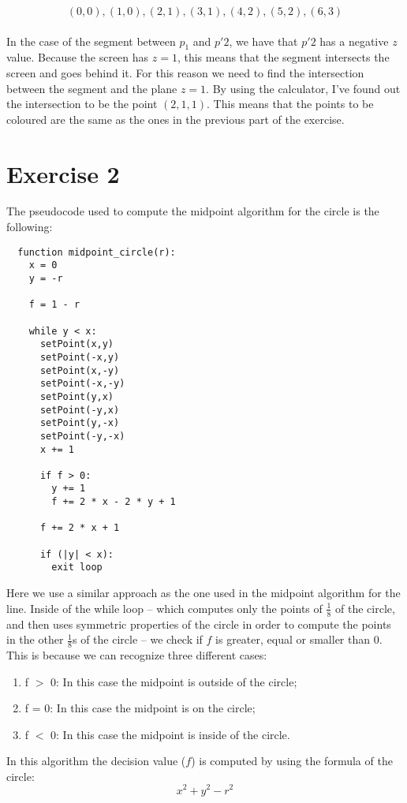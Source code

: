 \documentclass{article}
\begin{document}
\[ (0, 0), (1, 0), (2, 1), (3, 1), (4, 2), (5, 2), (6, 3) \]\\
In the case of the segment between $p_1$ and $p'2$, we have that $p'2$ has a negative $z$ value. Because the screen has $z=1$, this means that the segment intersects the screen and goes behind it. For this reason we need to find the intersection between the segment and the plane $z = 1$. By using the calculator, I've found out the intersection to be the point $(2,1,1)$. This means that the points to be coloured are the same as the ones in the previous part of the exercise.

\section{Exercise 2}
The pseudocode used to compute the midpoint algorithm for the circle is the following:

\begin{verbatim}
  function midpoint_circle(r):
    x = 0
    y = -r

    f = 1 - r

    while y < x:
      setPoint(x,y)
      setPoint(-x,y)
      setPoint(x,-y)
      setPoint(-x,-y)
      setPoint(y,x)
      setPoint(-y,x)
      setPoint(y,-x)
      setPoint(-y,-x)
      x += 1
        
      if f > 0:        
        y += 1
        f += 2 * x - 2 * y + 1
        
      f += 2 * x + 1

      if (|y| < x):
        exit loop
\end{verbatim}
Here we use a similar approach as the one used in the midpoint algorithm for the line. Inside of the while loop -- which computes only the points of $\frac{1}{8}$ of the circle, and then uses symmetric properties of the circle in order to compute the points in the other $\frac{1}{8}$s of the circle -- we check if $f$ is greater, equal or smaller than 0. This is because we can recognize three different cases:

\begin{enumerate}
	\item f $>$ 0: In this case the midpoint is outside of the circle;
	\item f = 0: In this case the midpoint is on the circle;
	\item f $<$ 0: In this case the midpoint is inside of the circle.
\end{enumerate}
In this algorithm the decision value ($f$) is computed by using the formula of the circle:
	\[ x^2 + y^2 - r^2 \]
\end{document}
